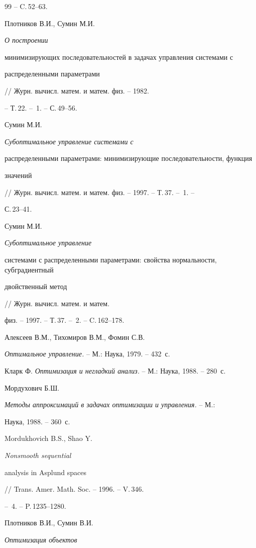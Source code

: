 \begin{thebibliography}{99}
-- C.\,52--63.




Плотников В.И., Сумин М.И. {\it О построении


минимизирующих последовательностей в задачах управления системами с


распределенными параметрами} // Журн. вычисл. матем. и матем. физ. -- 1982.


-- Т.\,22. -- \No\,1. -- С.\,49--56.




Сумин М.И. {\it Субоптимальное управление системами с


распределенными параметрами: минимизирующие последовательности, функция


значений} // Журн. вычисл. матем. и матем. физ. -- 1997. -- Т.\,37. -- \No\,1. --


С.\,23--41.




Сумин М.И. {\it Субоптимальное управление


системами с распределенными параметрами: свойства нормальности, субградиентный


двойственный метод} // Журн. вычисл. матем. и матем.


физ. -- 1997. -- Т.\,37. -- \No\,2. -- C.\,162--178.




Алексеев В.М., Тихомиров В.М., Фомин С.В.


{\it Оптимальное управление.} -- М.: Наука, 1979. -- 432~с.




Кларк Ф. {\it Оптимизация и негладкий анализ.} -- М.: Наука, 1988. -- 280~с.




Мордухович Б.Ш.


{\it Методы аппроксимаций в задачах оптимизации и управления.} -- М.: 


Наука, 1988. -- 360~с.




Mordukhovich B.S., Shao Y. {\it Nonsmooth sequential 


analysis in Asplund spaces} // Trans. Amer. Math. Soc. -- 1996. -- V.\,346.


-- \No\,4. -- P.\,1235--1280.




Плотников В.И., Сумин В.И. {\it Оптимизация объектов


}
\end{thebibliography}
